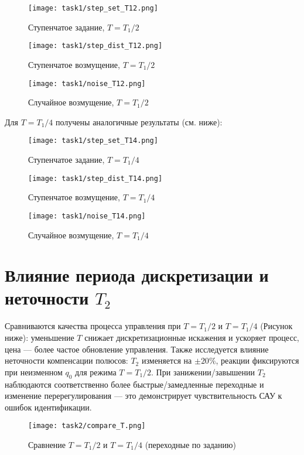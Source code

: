 \begin{figure}[H]
    \centering
    \texttt{[image: task1/step\_set\_T12.png]}
    \caption{Ступенчатое задание, $T=T_1/2$}
\end{figure}

\begin{figure}[H]
    \centering
    \texttt{[image: task1/step\_dist\_T12.png]}
    \caption{Ступенчатое возмущение, $T=T_1/2$}
\end{figure}

\begin{figure}[H]
    \centering
    \texttt{[image: task1/noise\_T12.png]}
    \caption{Случайное возмущение, $T=T_1/2$}
\end{figure}

Для $T=T_1/4$ получены аналогичные результаты (см. ниже):

\begin{figure}[H]
    \centering
    \texttt{[image: task1/step\_set\_T14.png]}
    \caption{Ступенчатое задание, $T=T_1/4$}
\end{figure}

\begin{figure}[H]
    \centering
    \texttt{[image: task1/step\_dist\_T14.png]}
    \caption{Ступенчатое возмущение, $T=T_1/4$}
\end{figure}

\begin{figure}[H]
    \centering
    \texttt{[image: task1/noise\_T14.png]}
    \caption{Случайное возмущение, $T=T_1/4$}
\end{figure}

\section{Влияние периода дискретизации и неточности $T_2$}
Сравниваются качества процесса управления при $T=T_1/2$ и $T=T_1/4$ (Рисунок ниже): уменьшение $T$ снижает дискретизационные искажения и ускоряет процесс, цена — более частое обновление управления. Также исследуется влияние неточности компенсации полюсов: $T_2$ изменяется на $\pm20\%$, реакции фиксируются при неизменном $q_0$ для режима $T=T_1/2$. При занижении/завышении $T_2$ наблюдаются соответственно более быстрые/замедленные переходные и изменение перерегулирования — это демонстрирует чувствительность САУ к ошибок идентификации.

\begin{figure}[H]
    \centering
    \texttt{[image: task2/compare\_T.png]}
    \caption{Сравнение $T=T_1/2$ и $T=T_1/4$ (переходные по заданию)}
\end{figure}

